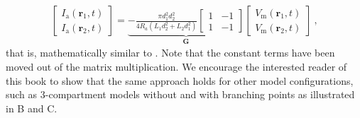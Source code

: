%
\begin{eqnarray}
\begin{bmatrix}
I_\text{a}(\mathbf{r}_1, t)\\
I_\text{a}(\mathbf{r}_2, t)
\end{bmatrix}
= \underbrace{
- \frac{\pi d_{1}^{2} d_{2}^{2}}{4 R_{a} \left(L_{1} d_{2}^{2} + L_{2} d_{1}^{2}\right)}
\begin{bmatrix}
1 & -1 \\
1 & -1
\end{bmatrix}
}_{\mathbf{G}}
\begin{bmatrix}
V_\text{m}(\mathbf{r}_1, t) \\
V_\text{m}(\mathbf{r}_2, t)
\end{bmatrix} ~,
\end{eqnarray}
%
that is, mathematically similar to . 
Note that the constant terms have been moved out of the matrix multiplication.
We encourage the interested reader of this book to show that the same approach holds for other model configurations, such
as 3-compartment models without and with branching points as illustrated in B and C.


